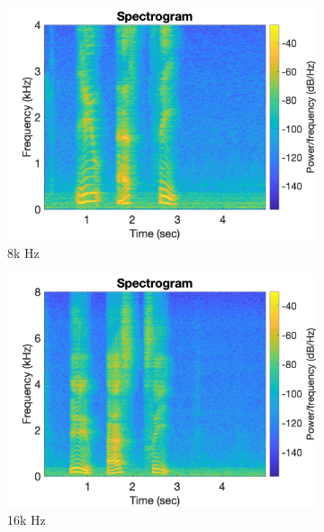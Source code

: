 \documentclass[11pt, oneside]{article}   	%
\begin{document}
\begin{figure}[ht]
\centering
\begin{subfigure}[b]{0.3\textwidth}
\includegraphics[width=\textwidth]{imgs/8k-spectrogram.jpg}
\caption{8k Hz}
\end{subfigure}
\begin{subfigure}[b]{0.3\textwidth}
\includegraphics[width=\textwidth]{imgs/16k-spectrogram.jpg}
\caption{16k Hz}
\end{subfigure}
\begin{subfigure}[b]{0.3\textwidth}

\end{subfigure}
\end{figure}
\end{document}
